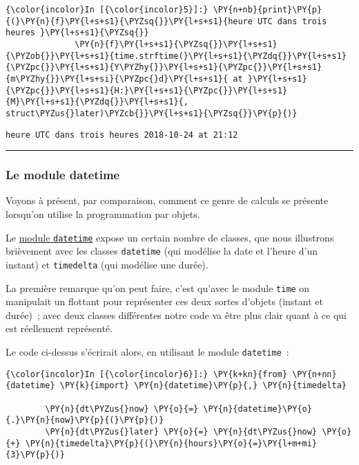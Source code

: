     \begin{Verbatim}[commandchars=\\\{\}]
{\color{incolor}In [{\color{incolor}5}]:} \PY{n+nb}{print}\PY{p}{(}\PY{n}{f}\PY{l+s+s1}{\PYZsq{}}\PY{l+s+s1}{heure UTC dans trois heures }\PY{l+s+s1}{\PYZsq{}}
              \PY{n}{f}\PY{l+s+s1}{\PYZsq{}}\PY{l+s+s1}{\PYZob{}}\PY{l+s+s1}{time.strftime(}\PY{l+s+s1}{\PYZdq{}}\PY{l+s+s1}{\PYZpc{}}\PY{l+s+s1}{Y\PYZhy{}}\PY{l+s+s1}{\PYZpc{}}\PY{l+s+s1}{m\PYZhy{}}\PY{l+s+si}{\PYZpc{}d}\PY{l+s+s1}{ at }\PY{l+s+s1}{\PYZpc{}}\PY{l+s+s1}{H:}\PY{l+s+s1}{\PYZpc{}}\PY{l+s+s1}{M}\PY{l+s+s1}{\PYZdq{}}\PY{l+s+s1}{, struct\PYZus{}later)\PYZcb{}}\PY{l+s+s1}{\PYZsq{}}\PY{p}{)}
\end{Verbatim}


    \begin{Verbatim}[commandchars=\\\{\}]
heure UTC dans trois heures 2018-10-24 at 21:12

    \end{Verbatim}

    \begin{center}\rule{0.5\linewidth}{\linethickness}\end{center}

    \hypertarget{le-module-datetime}{%
\subsubsection{Le module datetime}\label{le-module-datetime}}

    Voyons à présent, par comparaison, comment ce genre de calculs se
présente lorsqu'on utilise la programmation par objets.

Le \href{https://docs.python.org/3/library/datetime.html}{module
\texttt{datetime}} expose un certain nombre de classes, que nous
illustrons brièvement avec les classes \texttt{datetime} (qui modélise
la date et l'heure d'un instant) et \texttt{timedelta} (qui modélise une
durée).

La première remarque qu'on peut faire, c'est qu'avec le module
\texttt{time} on manipulait un flottant pour représenter ces deux sortes
d'objets (instant et durée)~; avec deux classes différentes notre code
va être plus clair quant à ce qui est réellement représenté.

    Le code ci-dessus s'écrirait alors, en utilisant le module
\texttt{datetime}~:

    \begin{Verbatim}[commandchars=\\\{\}]
{\color{incolor}In [{\color{incolor}6}]:} \PY{k+kn}{from} \PY{n+nn}{datetime} \PY{k}{import} \PY{n}{datetime}\PY{p}{,} \PY{n}{timedelta}
        
        \PY{n}{dt\PYZus{}now} \PY{o}{=} \PY{n}{datetime}\PY{o}{.}\PY{n}{now}\PY{p}{(}\PY{p}{)}
        \PY{n}{dt\PYZus{}later} \PY{o}{=} \PY{n}{dt\PYZus{}now} \PY{o}{+} \PY{n}{timedelta}\PY{p}{(}\PY{n}{hours}\PY{o}{=}\PY{l+m+mi}{3}\PY{p}{)}
\end{Verbatim}


